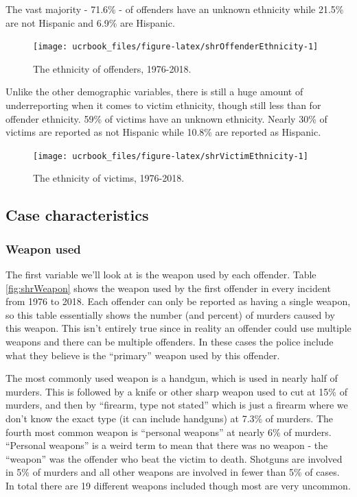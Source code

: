 \documentclass[
  12pt,
  openany]{book}
\begin{document}
The vast majority - 71.6\% - of offenders have an unknown ethnicity while 21.5\% are not Hispanic and 6.9\% are Hispanic.

\begin{figure}

{\centering \texttt{[image: ucrbook\_files/figure-latex/shrOffenderEthnicity-1]} 

}

\caption{The ethnicity of offenders, 1976-2018.}\label{fig:shrOffenderEthnicity}
\end{figure}

Unlike the other demographic variables, there is still a huge amount of underreporting when it comes to victim ethnicity, though still less than for offender ethnicity. 59\% of victims have an unknown ethnicity. Nearly 30\% of victims are reported as not Hispanic while 10.8\% are reported as Hispanic.

\begin{figure}

{\centering \texttt{[image: ucrbook\_files/figure-latex/shrVictimEthnicity-1]} 

}

\caption{The ethnicity of victims, 1976-2018.}\label{fig:shrVictimEthnicity}
\end{figure}

\hypertarget{case-characteristics}{%
\subsection{Case characteristics}\label{case-characteristics}}

\hypertarget{weapon-used}{%
\subsubsection{Weapon used}\label{weapon-used}}

The first variable we'll look at is the weapon used by each offender. Table \ref{fig:shrWeapon} shows the weapon used by the first offender in every incident from 1976 to 2018. Each offender can only be reported as having a single weapon, so this table essentially shows the number (and percent) of murders caused by this weapon. This isn't entirely true since in reality an offender could use multiple weapons and there can be multiple offenders. In these cases the police include what they believe is the ``primary'' weapon used by this offender.

The most commonly used weapon is a handgun, which is used in nearly half of murders. This is followed by a knife or other sharp weapon used to cut at 15\% of murders, and then by ``firearm, type not stated'' which is just a firearm where we don't know the exact type (it can include handguns) at 7.3\% of murders. The fourth most common weapon is ``personal weapons'' at nearly 6\% of murders. ``Personal weapons'' is a weird term to mean that there was no weapon - the ``weapon'' was the offender who beat the victim to death. Shotguns are involved in 5\% of murders and all other weapons are involved in fewer than 5\% of cases. In total there are 19 different weapons included though most are very uncommon.
\end{document}
